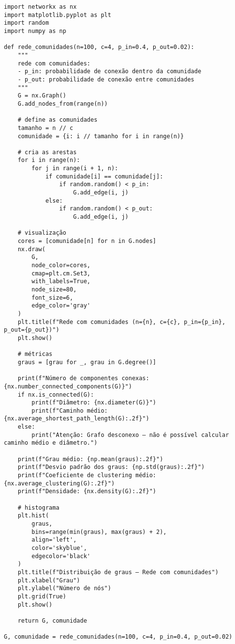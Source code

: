 \documentclass{article}
\begin{document}
\begin{verbatim}
import networkx as nx
import matplotlib.pyplot as plt
import random
import numpy as np

def rede_comunidades(n=100, c=4, p_in=0.4, p_out=0.02):
    """
    rede com comunidades:
    - p_in: probabilidade de conexão dentro da comunidade
    - p_out: probabilidade de conexão entre comunidades
    """
    G = nx.Graph()
    G.add_nodes_from(range(n))

    # define as comunidades
    tamanho = n // c
    comunidade = {i: i // tamanho for i in range(n)}

    # cria as arestas
    for i in range(n):
        for j in range(i + 1, n):
            if comunidade[i] == comunidade[j]:
                if random.random() < p_in:
                    G.add_edge(i, j)
            else:
                if random.random() < p_out:
                    G.add_edge(i, j)

    # visualização
    cores = [comunidade[n] for n in G.nodes]
    nx.draw(
        G,
        node_color=cores,
        cmap=plt.cm.Set3,
        with_labels=True,
        node_size=80,
        font_size=6,
        edge_color='gray'
    )
    plt.title(f"Rede com comunidades (n={n}, c={c}, p_in={p_in}, p_out={p_out})")
    plt.show()

    # métricas
    graus = [grau for _, grau in G.degree()]

    print(f"Número de componentes conexas: {nx.number_connected_components(G)}")
    if nx.is_connected(G):
        print(f"Diâmetro: {nx.diameter(G)}")
        print(f"Caminho médio: {nx.average_shortest_path_length(G):.2f}")
    else:
        print("Atenção: Grafo desconexo – não é possível calcular caminho médio e diâmetro.")

    print(f"Grau médio: {np.mean(graus):.2f}")
    print(f"Desvio padrão dos graus: {np.std(graus):.2f}")
    print(f"Coeficiente de clustering médio: {nx.average_clustering(G):.2f}")
    print(f"Densidade: {nx.density(G):.2f}")

    # histograma
    plt.hist(
        graus,
        bins=range(min(graus), max(graus) + 2),
        align='left',
        color='skyblue',
        edgecolor='black'
    )
    plt.title(f"Distribuição de graus — Rede com comunidades")
    plt.xlabel("Grau")
    plt.ylabel("Número de nós")
    plt.grid(True)
    plt.show()

    return G, comunidade

G, comunidade = rede_comunidades(n=100, c=4, p_in=0.4, p_out=0.02)

\end{verbatim}
\end{document}
